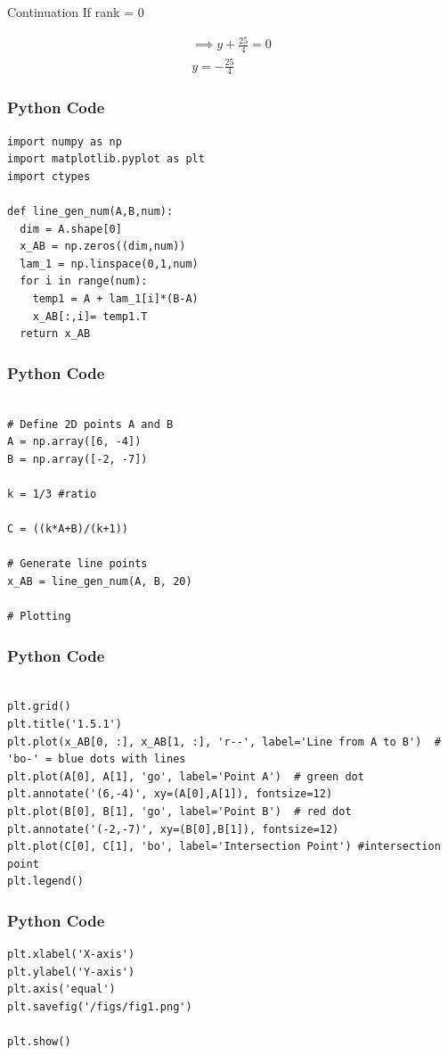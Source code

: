 \documentclass{beamer}
\begin{document}
\begin{frame}{Continuation}
If rank = 0

\begin{align}
    \implies y+\frac{25}{4} = 0\\
    y = -\frac{25}{4}
\end{align}
\end{frame}

\begin{frame}[fragile]
    \frametitle{Python Code}
    \begin{lstlisting}
import numpy as np
import matplotlib.pyplot as plt
import ctypes

def line_gen_num(A,B,num):
  dim = A.shape[0]
  x_AB = np.zeros((dim,num))
  lam_1 = np.linspace(0,1,num)
  for i in range(num):
    temp1 = A + lam_1[i]*(B-A)
    x_AB[:,i]= temp1.T
  return x_AB

\end{lstlisting}
\end{frame}

\begin{frame}[fragile]
\frametitle{Python Code}
    \begin{lstlisting}

# Define 2D points A and B
A = np.array([6, -4])
B = np.array([-2, -7])

k = 1/3 #ratio

C = ((k*A+B)/(k+1))

# Generate line points
x_AB = line_gen_num(A, B, 20)

# Plotting

\end{lstlisting}
\end{frame}

\begin{frame}[fragile]
\frametitle{Python Code}
    \begin{lstlisting}

plt.grid()
plt.title('1.5.1')
plt.plot(x_AB[0, :], x_AB[1, :], 'r--', label='Line from A to B')  # 'bo-' = blue dots with lines
plt.plot(A[0], A[1], 'go', label='Point A')  # green dot
plt.annotate('(6,-4)', xy=(A[0],A[1]), fontsize=12)
plt.plot(B[0], B[1], 'go', label='Point B')  # red dot
plt.annotate('(-2,-7)', xy=(B[0],B[1]), fontsize=12)
plt.plot(C[0], C[1], 'bo', label='Intersection Point') #intersection point
plt.legend()
\end{lstlisting}
\end{frame}

\begin{frame}[fragile]
\frametitle{Python Code}
    \begin{lstlisting}
plt.xlabel('X-axis')
plt.ylabel('Y-axis')
plt.axis('equal')
plt.savefig('/figs/fig1.png')

plt.show()

    \end{lstlisting}
    
\end{frame}
\end{document}
